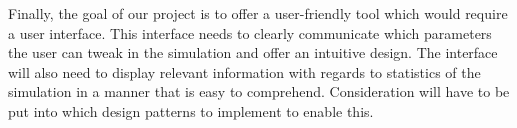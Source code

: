 Finally, the goal of our project is to offer a user-friendly tool which would require a user interface. This interface needs to clearly communicate which parameters the user can tweak in the simulation and offer an intuitive design. The interface will also need to display relevant information with regards to statistics of the simulation in a manner that is easy to comprehend. Consideration will have to be put into which design patterns to implement to enable this.